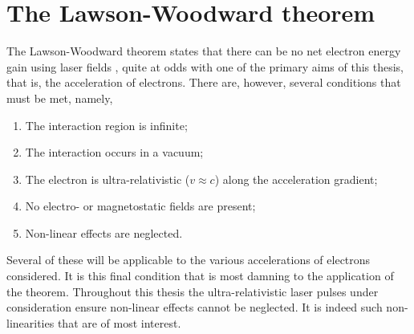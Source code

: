 \section{The Lawson-Woodward theorem}\label{sec:intro-lawson_woodward}
The Lawson-Woodward theorem states that there can be no net electron energy gain using laser fields \cite{esareyPhysicsLaserdrivenPlasmabased2009}, quite at odds with one of the primary aims of this thesis, that is, the acceleration of electrons. There are, however, several conditions that must be met, namely,
\begin{enumerate}
	\item The interaction region is infinite;
	\item The interaction  occurs in a vacuum;
	\item The electron is ultra-relativistic ($v\approx c$) along the acceleration gradient;
	\item No electro- or magnetostatic fields are present;
	\item Non-linear effects are neglected.
\end{enumerate}
Several of these will be applicable to the various accelerations of electrons considered. It is this final condition that is most damning to the application of the theorem. Throughout this thesis the ultra-relativistic laser pulses under consideration ensure non-linear effects cannot be neglected. It is indeed such non-linearities that are of most interest.


